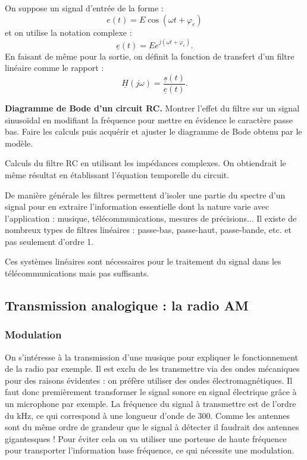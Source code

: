 On suppose un signal d'entrée de la forme :
\begin{equation}
e(t) = E\cos(\omega t+\varphi_e)
\end{equation}
et on utilise la notation complexe :
\begin{equation}
\underline{e}(t) = E e^{j(\omega t + \varphi_e)}.
\end{equation}
En faisant de même pour la sortie, on définit la fonction de transfert d'un filtre linéaire comme le rapport :
\begin{equation}
\underline{H}(j\omega) = \frac{\underline{s}(t)}{\underline{e}(t)}.
\end{equation}

\begin{experience}
\textbf{Diagramme de Bode d'un circuit RC.}
Montrer l'effet du filtre sur un signal sinusoïdal en modifiant la fréquence pour mettre en évidence le caractère passe bas.
Faire les calculs puis acquérir et ajuster le diagramme de Bode obtenu par le modèle.
\end{experience}

Calculs du filtre RC en utilisant les impédances complexes.
On obtiendrait le même résultat en établissant l'équation temporelle du circuit.

De manière générale les filtres permettent d'isoler une partie du spectre d'un signal pour en extraire l'information essentielle dont la nature varie avec l'application : musique, télécommunications, mesures de précisions...
Il existe de nombreux types de filtres linéaires : passe-bas, passe-haut, passe-bande, etc. et pas seulement d'ordre 1.

\begin{transition}
Ces systèmes linéaires sont nécessaires pour le traitement du signal dans les télécommunications mais pas suffisants.
\end{transition}

\subsection{Transmission analogique : la radio AM}

\subsubsection{Modulation}

On s'intéresse à la transmission d'une musique pour expliquer le fonctionnement de la radio par exemple.
Il est exclu de les transmettre via des ondes mécaniques pour des raisons évidentes : on préfère utiliser des ondes électromagnétiques.
Il faut donc premièrement transformer le signal sonore en signal électrique grâce à un microphone par exemple.
La fréquence du signal à transmettre est de l'ordre du kHz, ce qui correspond à une longueur d'onde de \unit{300}{\kilo\meter}.
Comme les antennes sont du même ordre de grandeur que le signal à détecter il faudrait des antennes gigantesques !
Pour éviter cela on va utiliser une porteuse de haute fréquence pour transporter l'information base fréquence, ce qui nécessite une modulation.

